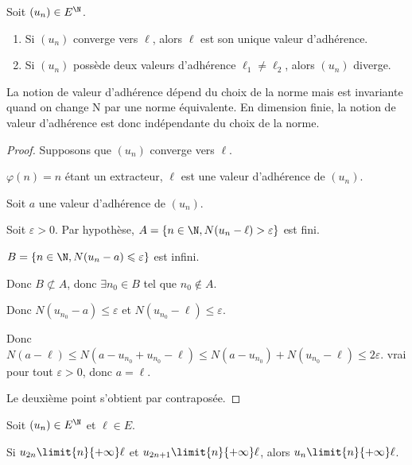 \begin{proposition}{}{}
    Soit $(u_n) \in E^{\N}$. 

    \begin{enumerate}
        \item Si $(u_n)$ converge vers $\ell$, alors $\ell$ est son unique valeur d'adhérence. 
        \item Si $(u_n)$ possède deux valeurs d'adhérence $\ell_1 \neq \ell_2$, alors $(u_n)$ diverge.
    \end{enumerate}
\end{proposition}

\begin{remarque}
    La notion de valeur d'adhérence dépend du choix de la norme mais est invariante 
    quand on change N par une norme équivalente. En dimension finie, la notion de valeur d'adhérence
    est donc indépendante du choix de la norme. 
\end{remarque}

\begin{proof}
    Supposons que $(u_n)$ converge vers $\ell$.

    $\varphi(n) =n$ étant un extracteur, $\ell$ est une valeur d'adhérence de $(u_n)$.

    \svspace Soit $a$ une valeur d'adhérence de $(u_n)$.
    
    Soit $\varepsilon > 0$. Par hypothèse, $A = \{n \in \N, N(u_n - \ell) > \varepsilon\}$ est 
    fini. 

    $B = \{n \in \N, N(u_n - a) \leqslant \varepsilon \}$ est infini. 

    Donc $B \not\subset A$, donc $\exists n_0 \in B$ tel que $n_0 \not\in A$.

    Donc $N(u_{n_0} - a) \leqslant \varepsilon$ et $N(u_{n_0} - \ell) \leqslant \varepsilon$.

    Donc $N(a - \ell) \leqslant N(a - u_{n_0} + u_{n_0} - \ell) \leqslant N(a - u_{n_0}) + N(u_{n_0} - \ell) \leqslant 2\varepsilon$.
    vrai pour tout $\varepsilon > 0$, donc $a = \ell$.

    Le deuxième point s'obtient par contraposée.
\end{proof}

\begin{proposition}{}{}
    Soit $(u_n) \in E^{\N}$ et $\ell \in E$.

    Si $u_{2n} \limit{n}{+\infty} \ell$ et $u_{2n + 1} \limit{n}{+\infty} \ell$, alors
    $u_n \limit{n}{+\infty} \ell$.
\end{proposition}

